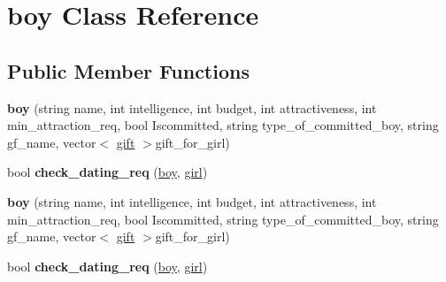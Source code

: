 \hypertarget{classboy}{}\section{boy Class Reference}
\label{classboy}
\subsection*{Public Member Functions}
\begin{DoxyCompactItemize}
\item 
\mbox{\label{classboy_a792c56f272dc241a5dad5027c0451a27}} 
{\bfseries boy} (string name, int intelligence, int budget, int attractiveness, int min\+\_\+attraction\+\_\+req, bool Iscommitted, string type\+\_\+of\+\_\+committed\+\_\+boy, string gf\+\_\+name, vector$<$ \hyperlink{classgift}{gift} $>$gift\+\_\+for\+\_\+girl)
\item 
\mbox{\label{classboy_a19a486b4a3b1d5334eb481ee7eee4200}} 
bool {\bfseries check\+\_\+dating\+\_\+req} (\hyperlink{classboy}{boy}, \hyperlink{classgirl}{girl})
\item 
\mbox{\label{classboy_a792c56f272dc241a5dad5027c0451a27}} 
{\bfseries boy} (string name, int intelligence, int budget, int attractiveness, int min\+\_\+attraction\+\_\+req, bool Iscommitted, string type\+\_\+of\+\_\+committed\+\_\+boy, string gf\+\_\+name, vector$<$ \hyperlink{classgift}{gift} $>$gift\+\_\+for\+\_\+girl)
\item 
\mbox{\label{classboy_a19a486b4a3b1d5334eb481ee7eee4200}} 
bool {\bfseries check\+\_\+dating\+\_\+req} (\hyperlink{classboy}{boy}, \hyperlink{classgirl}{girl})
\end{DoxyCompactItemize}
